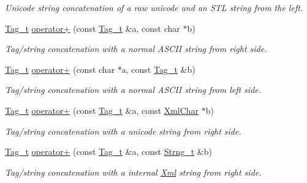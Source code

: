 \begin{DoxyCompactItemize}
\begin{DoxyCompactList}\small\item\em Unicode string concatenation of a raw unicode and an STL string from the left. \item\end{DoxyCompactList}\item 
\hyperlink{class_d_d4hep_1_1_x_m_l_1_1_tag__t}{Tag\_\-t} \hyperlink{group___d_d4_h_e_p___x_m_l_gacf5fdc46e1dad4d2935283ead3a4c0fd}{operator+} (const \hyperlink{class_d_d4hep_1_1_x_m_l_1_1_tag__t}{Tag\_\-t} \&a, const char $\ast$b)
\begin{DoxyCompactList}\small\item\em Tag/string concatenation with a normal ASCII string from right side. \item\end{DoxyCompactList}\item 
\hyperlink{class_d_d4hep_1_1_x_m_l_1_1_tag__t}{Tag\_\-t} \hyperlink{group___d_d4_h_e_p___x_m_l_ga16ba3dffdb36f1a0ae319fde7dcdb5ca}{operator+} (const char $\ast$a, const \hyperlink{class_d_d4hep_1_1_x_m_l_1_1_tag__t}{Tag\_\-t} \&b)
\begin{DoxyCompactList}\small\item\em Tag/string concatenation with a normal ASCII string from left side. \item\end{DoxyCompactList}\item 
\hyperlink{class_d_d4hep_1_1_x_m_l_1_1_tag__t}{Tag\_\-t} \hyperlink{group___d_d4_h_e_p___x_m_l_ga658bb45f4c5cc614a2508957b27c0bd7}{operator+} (const \hyperlink{class_d_d4hep_1_1_x_m_l_1_1_tag__t}{Tag\_\-t} \&a, const \hyperlink{namespace_d_d4hep_1_1_x_m_l_a09e5d9cc86ed782f6826dfe0778c1815}{XmlChar} $\ast$b)
\begin{DoxyCompactList}\small\item\em Tag/string concatenation with a unicode string from right side. \item\end{DoxyCompactList}\item 
\hyperlink{class_d_d4hep_1_1_x_m_l_1_1_tag__t}{Tag\_\-t} \hyperlink{group___d_d4_h_e_p___x_m_l_ga64cd4f3e74d5147d8a0dda8d7dc5b372}{operator+} (const \hyperlink{class_d_d4hep_1_1_x_m_l_1_1_tag__t}{Tag\_\-t} \&a, const \hyperlink{class_d_d4hep_1_1_x_m_l_1_1_strng__t}{Strng\_\-t} \&b)
\begin{DoxyCompactList}\small\item\em Tag/string concatenation with a internal \hyperlink{union_xml}{Xml} string from right side. \item\end{DoxyCompactList}\item 

\end{DoxyCompactItemize}
